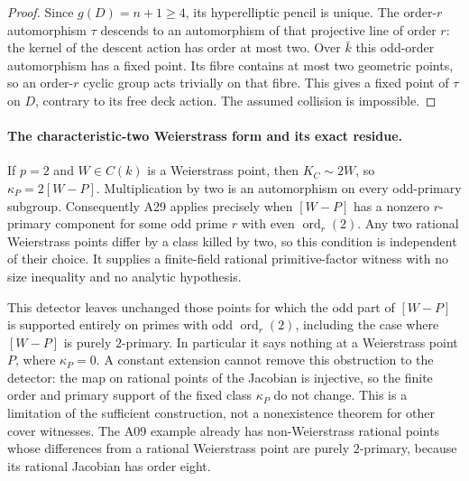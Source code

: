 \begin{proof}
Since $g(D)=n+1\ge4$, its hyperelliptic pencil is unique.
The order-$r$ automorphism $\tau$ descends to an automorphism
of that projective line of order $r$: the kernel of the descent
action has order at most two. Over $\bar k$ this odd-order
automorphism has a fixed point. Its fibre contains at most two
geometric points, so an order-$r$ cyclic group acts trivially on
that fibre. This gives a fixed point of $\tau$ on $D$, contrary
to its free deck action. The assumed collision is impossible.
\end{proof}

\paragraph{The characteristic-two Weierstrass form and its exact residue.}
If $p=2$ and $W\in C(k)$ is a Weierstrass point, then
$K_C\sim2W$, so $\kappa_P=2[W-P]$. Multiplication by two is
an automorphism on every odd-primary subgroup. Consequently A29
applies precisely when $[W-P]$ has a nonzero $r$-primary component
for some odd prime $r$ with even $\operatorname{ord}_r(2)$.
Any two rational Weierstrass points differ by a class killed by
two, so this condition is independent of their choice.
It supplies a finite-field rational primitive-factor witness with
no size inequality and no analytic hypothesis.

This detector leaves unchanged those points for which the odd part
of $[W-P]$ is supported entirely on primes with odd
$\operatorname{ord}_r(2)$, including the case where $[W-P]$ is
purely $2$-primary. In particular it says nothing at a Weierstrass
point $P$, where $\kappa_P=0$. A constant extension cannot remove
this obstruction to the detector: the map on rational points of
the Jacobian is injective, so the finite order and primary support
of the fixed class $\kappa_P$ do not change. This is a limitation
of the sufficient construction, not a nonexistence theorem for
other cover witnesses. The A09 example already has non-Weierstrass
rational points whose differences from a rational Weierstrass
point are purely $2$-primary, because its rational Jacobian has
order eight.


